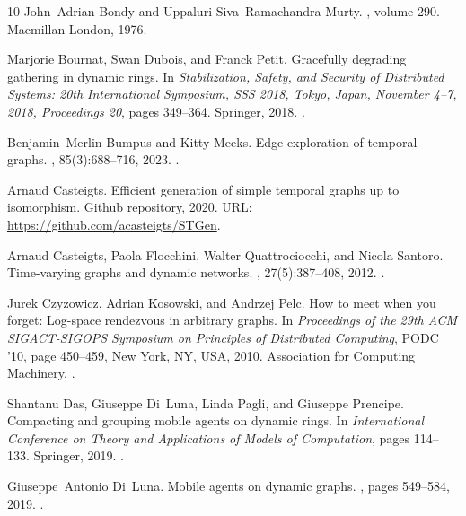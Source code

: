 \documentclass[10pt,a4paper]{article}
\begin{document}
\begin{thebibliography}{10}
John~Adrian Bondy and Uppaluri Siva~Ramachandra Murty.
, volume 290.
\newblock Macmillan London, 1976.

Marjorie Bournat, Swan Dubois, and Franck Petit.
\newblock Gracefully degrading gathering in dynamic rings.
\newblock In {\em Stabilization, Safety, and Security of Distributed Systems:
  20th International Symposium, SSS 2018, Tokyo, Japan, November 4--7, 2018,
  Proceedings 20}, pages 349--364. Springer, 2018.
\newblock \href {https://doi.org/10.1007/978-3-030-03232-6_23}
  {}.

Benjamin~Merlin Bumpus and Kitty Meeks.
\newblock Edge exploration of temporal graphs.
, 85(3):688--716, 2023.
\newblock \href {https://doi.org/10.1007/s00453-022-01018-7}
  {}.

Arnaud Casteigts.
\newblock Efficient generation of simple temporal graphs up to isomorphism.
\newblock Github repository, 2020.
\newblock URL: \url{https://github.com/acasteigts/STGen}.

Arnaud Casteigts, Paola Flocchini, Walter Quattrociocchi, and Nicola Santoro.
\newblock Time-varying graphs and dynamic networks.
, 27(5):387--408,
  2012.
\newblock \href {https://doi.org/10.1080/17445760.2012.668546}
  {}.

Jurek Czyzowicz, Adrian Kosowski, and Andrzej Pelc.
\newblock How to meet when you forget: Log-space rendezvous in arbitrary
  graphs.
\newblock In {\em Proceedings of the 29th ACM SIGACT-SIGOPS Symposium on
  Principles of Distributed Computing}, PODC '10, page 450–459, New York, NY,
  USA, 2010. Association for Computing Machinery.
\newblock \href {https://doi.org/10.1145/1835698.1835801}
  {}.

Shantanu Das, Giuseppe Di~Luna, Linda Pagli, and Giuseppe Prencipe.
\newblock Compacting and grouping mobile agents on dynamic rings.
\newblock In {\em International Conference on Theory and Applications of Models
  of Computation}, pages 114--133. Springer, 2019.
\newblock \href {https://doi.org/10.1007/978-3-030-14812-6_8}
  {}.

Giuseppe~Antonio Di~Luna.
\newblock Mobile agents on dynamic graphs.
, pages 549--584, 2019.
\newblock \href {https://doi.org/10.1007/978-3-030-11072-7_20}
  {}.


\end{thebibliography}
\end{document}
